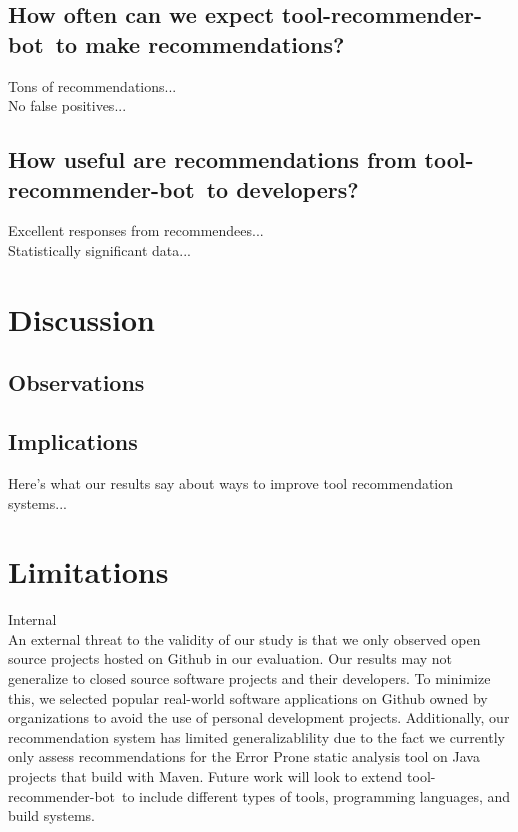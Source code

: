 \documentclass[conference]{IEEEtran}
\newcommand{\tool}{tool-recommender-bot}
\begin{document}
\subsection{How often can we expect \tool~to make recommendations?}

Tons of recommendations... \\

No false positives... \\

\subsection{How useful are recommendations from \tool~to developers?}

Excellent responses from recommendees...\\

Statistically significant data...

\section{Discussion}

\subsection{Observations}

\subsection{Implications}

Here's what our results say about ways to improve tool recommendation systems...

\section{Limitations}

Internal\\

An external threat to the validity of our study is that we only observed open source projects hosted on Github in our evaluation. Our results may not generalize to closed source software projects and their developers. To minimize this, we selected popular real-world software applications on Github owned by organizations to avoid the use of personal development projects. Additionally, our recommendation system has limited generalizablility due to the fact we currently only assess recommendations for the Error Prone static analysis tool on Java projects that build with Maven. Future work will look to extend \tool~to include different types of tools, programming languages, and build systems.
\end{document}
